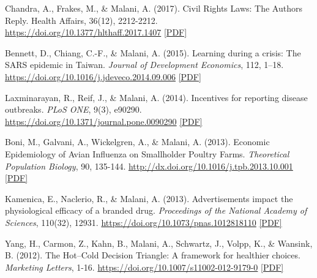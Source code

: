 \begin{tablist}
        \item[] \tab{}Chandra, A., Frakes, M., \& Malani, A. (2017). Civil Rights Laws: The Authors Reply. Health Affairs, 36(12), 2212-2212. \href{https://doi.org/10.1377/hlthaff.2017.1407}{https://doi.org/10.1377/hlthaff.2017.1407} \href{https://github.com/anup-malani/website_personal/blob/main/publications/2017_ChandraMalani_ReplyCivilRights.pdf}{[PDF]}
        
        \item[2015] \tab{}Bennett, D., Chiang, C.-F., \& Malani, A. (2015). Learning during a crisis: The SARS epidemic in Taiwan. \textit{Journal of Development Economics}, 112, 1–18. \href{https://doi.org/10.1016/j.jdeveco.2014.09.006}{https://doi.org/10.1016/j.jdeveco.2014.09.006} \href{https://github.com/anup-malani/website_personal/blob/main/publications/2015_BennettChiangMalani_JDE_SARSLearning.pdf}{[PDF]}
        
        \item[2014] \tab{}Laxminarayan, R., Reif, J., \& Malani, A. (2014). Incentives for reporting disease outbreaks. \textit{PLoS ONE}, 9(3), e90290. \href{https://doi.org/10.1371/journal.pone.0090290}{https://doi.org/10.1371/journal.pone.0090290} \href{https://github.com/anup-malani/website_personal/blob/main/publications/2014_LaxminarayanReifMalani_PLOSOne_IncentivesDiseaseReporting.pdf}{[PDF]}

        \item[2013] \tab{}Boni, M., Galvani, A., Wickelgren, A., \& Malani, A. (2013). Economic Epidemiology of Avian Influenza on Smallholder Poultry Farms. \textit{Theoretical Population Biology}, 90, 135-144. \href{http://dx.doi.org/10.1016/j.tpb.2013.10.001}{http://dx.doi.org/10.1016/j.tpb.2013.10.001} \href{https://github.com/anup-malani/website_personal/blob/main/publications/2013_BoniMalani_AvianFlu.pdf}{[PDF]}
    
        \item[2013] \tab{}Kamenica, E., Naclerio, R., \& Malani, A. (2013). Advertisements impact the physiological efficacy of a branded drug. \textit{Proceedings of the National Academy of Sciences}, 110(32), 12931. \href{https://doi.org/10.1073/pnas.1012818110}{https://doi.org/10.1073/pnas.1012818110} \href{https://github.com/anup-malani/website_personal/blob/main/publications/2013_KamenicaMalani_PNAS_PlaceboAds.pdf}{[PDF]} 

        \item[2012] \tab{}Yang, H., Carmon, Z., Kahn, B., Malani, A., Schwartz, J., Volpp, K., \& Wansink, B. (2012). The Hot–Cold Decision Triangle: A framework for healthier choices. \textit{Marketing Letters}, 1-16. \href{https://doi.org/10.1007/s11002-012-9179-0}{https://doi.org/10.1007/s11002-012-9179-0} \href{https://github.com/anup-malani/website_personal/blob/main/publications/2012_YangMalani_MarketingLetters_HotColdTriangle.pdf}{[PDF]}  
    

\end{tablist}
